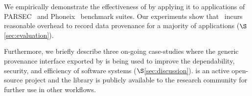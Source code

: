 We  empirically demonstrate  the effectiveness of \projecttitle by applying it to applications of  PARSEC~\cite{parsec} and Phoneix~\cite{phoenix} benchmark suites. Our experiments show that \projecttitle~incurs reasonable overhead to record data provenance for a majority of applications ($\S$\ref{sec:evaluation}). 

Furthermore, we briefly describe three on-going case-studies where the generic provenance interface exported by \projecttitle is being used to improve the dependability, security, and efficiency of software systems  ($\S$\ref{sec:discussion}). \projecttitle is an active open-source project and the library is publicly available to the research community for further use in other workflows.  

